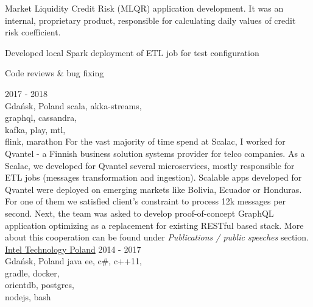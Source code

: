 \documentclass[a4paper,11pt]{cv4tw}%
\begin{document}
      {Market Liquidity Credit Risk (MLQR) application development. It was an internal,
        proprietary product, responsible for calculating daily values of credit risk
        coefficient.
        \begin{missions}
        \item Developed local Spark deployment of ETL job for test configuration
        \item Code reviews \& bug fixing
        \end{missions}
      }
      {2017 - 2018\\Gdańsk, Poland}
      {scala, akka-streams,\\graphql, cassandra,\\kafka, play, mtl,\\flink, marathon}
      {For the vast majority of time spend at Scalac, I worked for Qvantel - a Finnish business solution systems provider for telco companies.
        As a Scalac, we developed for Qvantel several microservices, mostly responsible for ETL jobs (messages transformation and ingestion).
        Scalable apps developed for Qvantel were deployed on emerging markets like Bolivia, Ecuador or Honduras. For one of them we satisfied client's constraint
        to process \approx12k messages per second. Next, the team was asked to develop proof-of-concept
        GraphQL application optimizing as a replacement for existing RESTful based stack. More about this
        cooperation can be found under \emph{Publications / public speeches} section.
      }
      {\href{https://www.intel.com/content/www/us/en/jobs/locations/poland.html}
        {Intel Technology Poland}}
      {2014 - 2017\\Gdańsk, Poland}
      {java ee, c\#, c++11,\\gradle, docker,\\orientdb, postgres,\\nodejs, bash}
\end{document}
